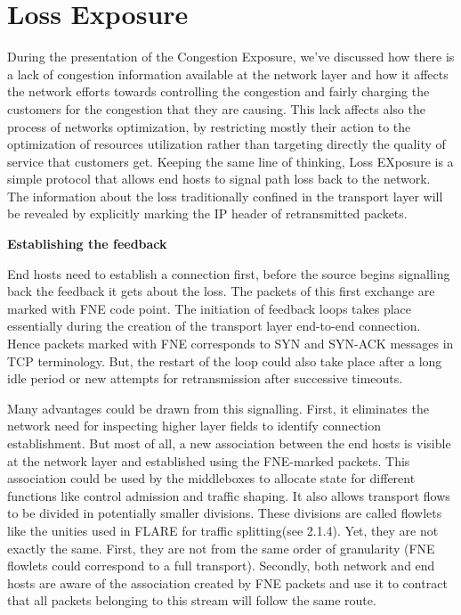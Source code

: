 
\section{Loss Exposure}

During the presentation of the Congestion Exposure, we've discussed how there is a lack of congestion information available at the network layer and how it affects the network efforts towards controlling the congestion and fairly charging the customers for the congestion that they are causing. This lack affects also the process of networks optimization, by restricting mostly their action to the optimization of resources utilization rather than targeting directly the quality of service that customers get. Keeping the same line of thinking, Loss EXposure is a simple protocol that allows end hosts to signal path loss back to the network. The information about the loss traditionally confined in the transport layer will be revealed by explicitly marking the IP header of retransmitted  packets.

{\bf Establishing the feedback}

End hosts need to establish a connection first, before the source begins signalling back the feedback it gets about the loss. The packets of this first exchange are marked with FNE code point. The initiation of  feedback loops takes place essentially during the creation of the transport layer end-to-end connection.  Hence packets marked with FNE corresponds to SYN and SYN-ACK messages in TCP terminology. But, the restart of the loop could also take place after a long idle period or new attempts for retransmission after successive timeouts.

Many advantages could be drawn from this signalling. First, it eliminates the network need for inspecting higher layer fields to identify connection establishment. But most of all, a new  association between the end hosts is visible at the network layer and established using the FNE-marked packets. This association could be used by the middleboxes to allocate state for different functions like control admission and traffic shaping. It also allows transport flows to be divided in potentially smaller divisions. These divisions are called flowlets like the unities used in FLARE for traffic splitting(see 2.1.4). Yet, they are not exactly the same. First, they are not from the same order of granularity (FNE flowlets could correspond to a full transport). Secondly, both network and end hosts are aware of the association created by FNE packets and use it to contract that all packets belonging to this stream will follow the same route.

